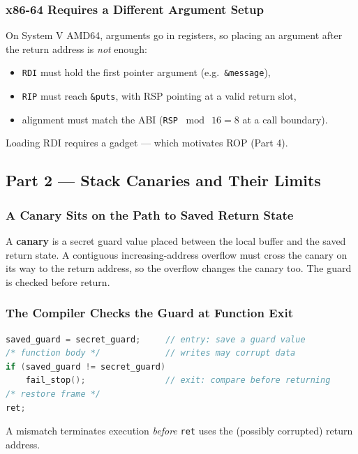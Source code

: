 \documentclass[hidelinks]{article}
\begin{document}
\subsubsection{x86-64 Requires a Different Argument Setup}

On System V AMD64, arguments go in registers, so placing an argument after the return address is \emph{not} enough:
\begin{itemize}
    \item \texttt{RDI} must hold the first pointer argument (e.g.\ \texttt{\&message}),
    \item \texttt{RIP} must reach \texttt{\&puts}, with RSP pointing at a valid return slot,
    \item alignment must match the ABI (\texttt{RSP} $\bmod\ 16 = 8$ at a call boundary).
\end{itemize}
Loading RDI requires a gadget --- which motivates ROP (Part 4).

\subsection{Part 2 --- Stack Canaries and Their Limits}

\subsubsection{A Canary Sits on the Path to Saved Return State}

A \textbf{canary} is a secret guard value placed between the local buffer and the saved return state. A contiguous increasing-address overflow must cross the canary on its way to the return address, so the overflow changes the canary too. The guard is checked before return.

\subsubsection{The Compiler Checks the Guard at Function Exit}

\begin{lstlisting}[language=C]
saved_guard = secret_guard;     // entry: save a guard value
/* function body */             // writes may corrupt data
if (saved_guard != secret_guard)
    fail_stop();                // exit: compare before returning
/* restore frame */
ret;
\end{lstlisting}
A mismatch terminates execution \emph{before} \texttt{ret} uses the (possibly corrupted) return address.
\end{document}
